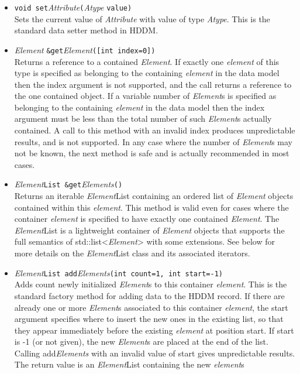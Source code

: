 \documentclass{revtex4}
\begin{document}
\begin{itemize}
\begin{itemize}
\item \texttt{void set}{\em Attribute}\texttt{(}{\em Atype} \texttt{value)}\\
Sets the current value of {\em Attribute} with value of type {\em Atype}.
This is the standard data setter method in HDDM.
\item {\em Element} \texttt{\&get}{\em Element}\texttt{([int index=0])}\\
Returns a reference to a contained {\em Element}. If exactly one {\em element}
of this type is specified as belonging to the containing {\em element} in the
data model then the index argument is not supported, and the call returns a
reference to the one contained object. If a variable number of {\em Element}s
is specified as belonging to the containing {\em element} in the data model
then the index argument must be less than the total number of such
{\em Element}s actually contained. A call to this method with an invalid index
produces unpredictable results, and is not supported. In any case where the
number of {\em Element}s may not be known, the next method is safe and is
actually recommended in most cases.
\item {\em Element}\texttt{List \&get}{\em Elements}\texttt{()}\\
Returns an iterable {\em Element}List containing an ordered list of 
{\em Element} objects contained within this {\em element}. This method is valid
even for cases where the container {\em element} is specified to have exactly
one contained {\em Element}. The {\em Element}List is a lightweight container
of {\em Element} objects that supports the full semantics of
std::list<{\em Element}> with some extensions. See below for more
details on the {\em Element}List class and its associated iterators.
\item {\em Element}\texttt{List add}{\em Elements}\texttt{(int count=1, int start=-1)}\\
Adds count newly initialized {\em Element}s to this container {\em element}.
This is the standard factory method for adding data to the HDDM record. If
there are already one or more {\em Element}s associated to this container
{\em element}, the start
argument specifies where to insert the new ones in the existing list, so that
they appear immediately before the existing {\em element} at position start.
If start is -1 (or not given), the new {\em Element}s are placed at the end
of the list. Calling add{\em Elements} with an invalid value of start gives
unpredictable results. The
return value is an {\em Element}List containing the new {\em element}s

\end{itemize}
\end{itemize}
\end{document}
